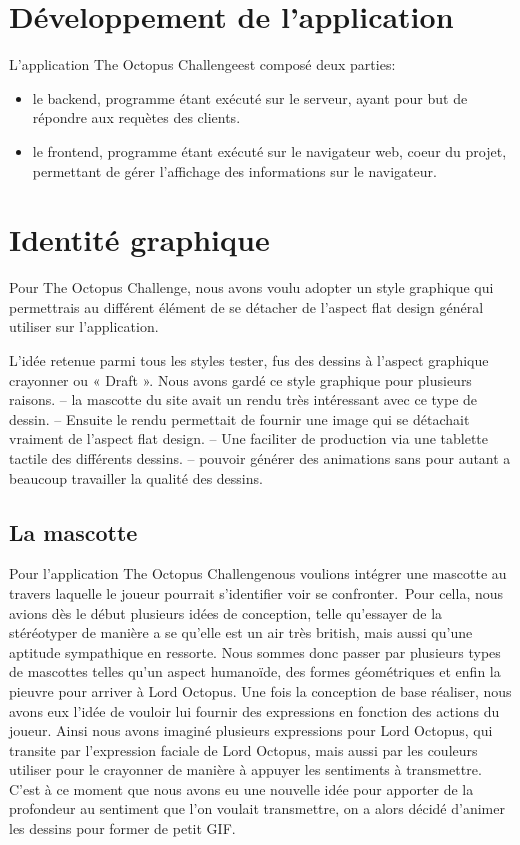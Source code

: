 \documentclass[a4paper,11pt, oneside]{book}
\def\appName{The Octopus Challenge}
\def\octopusName{Lord Octopus}
\begin{document}
\clearpage
\section{Développement de l'application}


L'application \appName est composé deux parties:
\begin{itemize}
	\item le backend, programme étant exécuté sur le serveur, ayant pour but de répondre aux requètes des clients.
	\item le frontend, programme étant exécuté sur le navigateur web, coeur du projet, permettant de gérer l'affichage des informations sur le navigateur.
\end{itemize}

\section{Identité graphique}

Pour \appName, nous avons voulu adopter un style graphique qui permettrais au différent élément de se détacher de l’aspect flat design général utiliser sur l’application.

L’idée retenue parmi tous les styles tester, fus des dessins à l’aspect graphique crayonner ou « Draft ».
Nous avons gardé ce style graphique pour plusieurs raisons.
– la mascotte du site avait un rendu très intéressant avec ce type de dessin. 
– Ensuite le rendu permettait de fournir une image qui se détachait vraiment de l’aspect flat design.
– Une faciliter de production via une tablette tactile des différents dessins.
– pouvoir générer des animations sans pour autant a beaucoup travailler la qualité des dessins.

\subsection*{La mascotte}
Pour l’application \appName nous voulions intégrer une mascotte au travers laquelle le joueur pourrait s’identifier voir se confronter.\
Pour cella, nous avions dès le début plusieurs idées de conception, telle qu’essayer de la stéréotyper de manière a se qu’elle est un air très british, mais aussi qu’une aptitude sympathique en ressorte.
Nous sommes donc passer par plusieurs types de mascottes telles qu’un aspect humanoïde, des formes géométriques et enfin la pieuvre pour arriver à \octopusName.
Une fois la conception de base réaliser, nous avons eux l’idée de vouloir lui fournir des expressions en fonction des actions du joueur.
Ainsi nous avons imaginé plusieurs expressions pour \octopusName, qui transite par l’expression faciale de \octopusName, mais aussi par les couleurs utiliser pour le crayonner de manière à appuyer les sentiments à transmettre. C’est à ce moment que nous avons eu une nouvelle idée pour apporter de la profondeur au sentiment que l’on voulait transmettre, on a alors décidé d’animer les dessins pour former de petit GIF.
\end{document}
